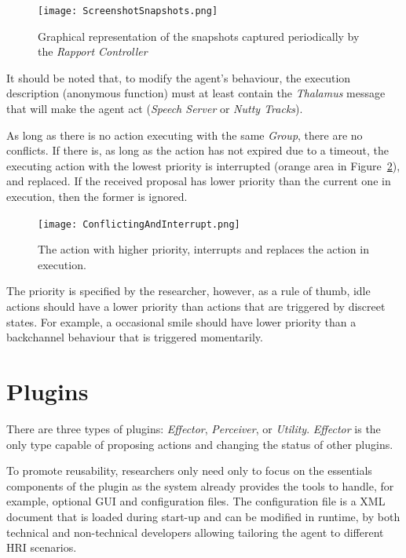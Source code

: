 \begin{figure}[H]
	\centering
	\texttt{[image: ScreenshotSnapshots.png]}
	\caption{Graphical representation of the snapshots captured periodically by the \textit{Rapport Controller}}
	\label{fig:controllerSnapshots}
\end{figure}

It should be noted that, to modify the agent's behaviour, the execution description (anonymous function) must at least contain the \textit{Thalamus} message that will make the agent act (\textit{Speech Server} or \textit{Nutty Tracks}).


As long as there is no action executing with the same \textit{Group}, there are no conflicts. If there is, as long as the action has not expired due to a timeout, the executing action with the lowest priority is interrupted (orange area in Figure~\ref{fig:conflict_interrupt}), and replaced. If the received proposal has lower priority than the current one in execution, then the former is ignored.

\begin{figure}[H]
	\centering
	\texttt{[image: ConflictingAndInterrupt.png]}
	\caption{The action with higher priority, interrupts and replaces the action in execution.}
	\label{fig:conflict_interrupt}
\end{figure}


The priority is specified by the researcher, however, as a rule of thumb, idle actions should have a lower priority than actions that are triggered by discreet states. For example, a occasional smile should have lower priority than a backchannel behaviour that is triggered momentarily.


\section{Plugins}
\label{sec:plugins}

There are three types of plugins: \textit{Effector}, \textit{Perceiver}, or \textit{Utility}. \textit{Effector} is the only type capable of proposing actions and changing the status of other plugins.

To promote reusability, researchers only need only to focus on the essentials components of the plugin as the system already provides the tools to handle, for example, optional \ac{GUI} and configuration files. The configuration file is a \ac{XML} document that is loaded during start-up and can be modified in runtime, by both technical and non-technical developers allowing tailoring the agent to different \ac{HRI} scenarios.

